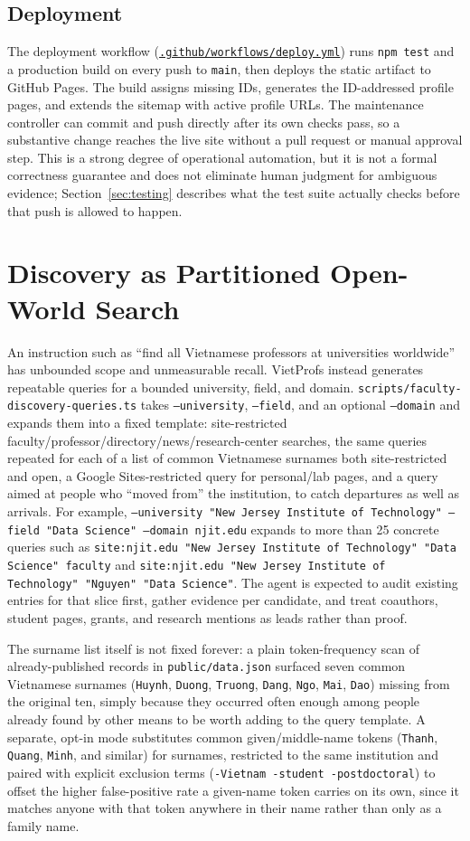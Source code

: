 \documentclass[11pt]{article}
\newcommand{\code}[1]{\texttt{\small #1}}
\newcommand{\ghrepo}{https://github.com/dynaroars/vietprofs}
\newcommand{\codelink}[1]{\href{\ghrepo/blob/main/#1}{\code{#1}}}
\begin{document}
\subsection{Deployment}
The deployment workflow (\codelink{.github/workflows/deploy.yml}) runs \code{npm test} and a production build on every push to \code{main}, then deploys the static artifact to GitHub Pages. The build assigns missing IDs, generates the ID-addressed profile pages, and extends the sitemap with active profile URLs.
The maintenance controller can commit and push directly after its own checks pass, so a substantive change reaches the live site without a pull request or manual approval step.
This is a strong degree of operational automation, but it is not a formal correctness guarantee and does not eliminate human judgment for ambiguous evidence; Section~\ref{sec:testing} describes what the test suite actually checks before that push is allowed to happen.

\section{Discovery as Partitioned Open-World Search}
An instruction such as ``find all Vietnamese professors at universities worldwide'' has unbounded scope and unmeasurable recall.
VietProfs instead generates repeatable queries for a bounded university, field, and domain.
\code{scripts/faculty-discovery-queries.ts} takes \code{--university}, \code{--field}, and an optional \code{--domain} and expands them into a fixed template: site-restricted faculty/professor/directory/news/research-center searches, the same queries repeated for each of a list of common Vietnamese surnames both site-restricted and open, a Google Sites-restricted query for personal/lab pages, and a query aimed at people who ``moved from'' the institution, to catch departures as well as arrivals.
For example, \code{--university "New Jersey Institute of Technology" --field "Data Science" --domain njit.edu} expands to more than 25 concrete queries such as \code{site:njit.edu "New Jersey Institute of Technology" "Data Science" faculty} and \code{site:njit.edu "New Jersey Institute of Technology" "Nguyen" "Data Science"}.
The agent is expected to audit existing entries for that slice first, gather evidence per candidate, and treat coauthors, student pages, grants, and research mentions as leads rather than proof.

The surname list itself is not fixed forever: a plain token-frequency scan of already-published records in \code{public/data.json} surfaced seven common Vietnamese surnames (\code{Huynh}, \code{Duong}, \code{Truong}, \code{Dang}, \code{Ngo}, \code{Mai}, \code{Dao}) missing from the original ten, simply because they occurred often enough among people already found by other means to be worth adding to the query template. A separate, opt-in mode substitutes common given/middle-name tokens (\code{Thanh}, \code{Quang}, \code{Minh}, and similar) for surnames, restricted to the same institution and paired with explicit exclusion terms (\code{-Vietnam -student -postdoctoral}) to offset the higher false-positive rate a given-name token carries on its own, since it matches anyone with that token anywhere in their name rather than only as a family name.
\end{document}

